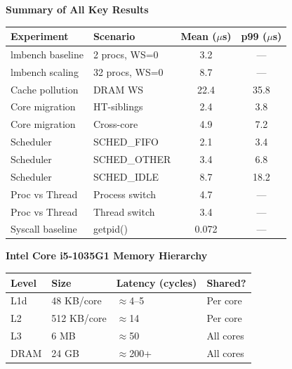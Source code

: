 \documentclass[12pt,a4paper]{article}
\begin{document}
\begin{center}
\textbf{Summary of All Key Results}\\[6pt]
\begin{tabular}{llcc}
\toprule
\textbf{Experiment} & \textbf{Scenario} & \textbf{Mean ($\mu$s)} & \textbf{p99 ($\mu$s)}\\
\midrule
lmbench baseline & 2 procs, WS=0 & 3.2 & ---\\
lmbench scaling & 32 procs, WS=0 & 8.7 & ---\\
Cache pollution & DRAM WS & 22.4 & 35.8\\
Core migration & HT-siblings & 2.4 & 3.8\\
Core migration & Cross-core & 4.9 & 7.2\\
Scheduler & SCHED\_FIFO & 2.1 & 3.4\\
Scheduler & SCHED\_OTHER & 3.4 & 6.8\\
Scheduler & SCHED\_IDLE & 8.7 & 18.2\\
Proc vs Thread & Process switch & 4.7 & ---\\
Proc vs Thread & Thread switch & 3.4 & ---\\
Syscall baseline & getpid() & 0.072 & ---\\
\bottomrule
\end{tabular}
\end{center}

\vspace{1em}
\begin{center}
\textbf{Intel Core i5-1035G1 Memory Hierarchy}\\[6pt]
\begin{tabular}{llll}
\toprule
\textbf{Level} & \textbf{Size} & \textbf{Latency (cycles)} & \textbf{Shared?}\\
\midrule
L1d & 48 KB/core & $\approx$4--5 & Per core\\
L2 & 512 KB/core & $\approx$14 & Per core\\
L3 & 6 MB & $\approx$50 & All cores\\
DRAM & 24 GB & $\approx$200+ & All cores\\
\bottomrule
\end{tabular}
\end{center}
\end{document}
